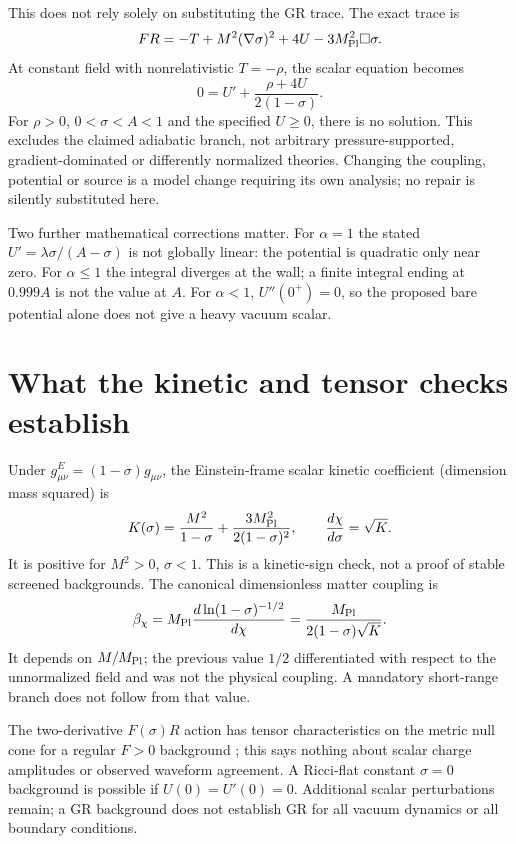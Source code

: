\documentclass[11pt,a4paper]{article}
\newcommand{\Mpl}{M_{\rm Pl}}
\begin{document}
This does not rely solely on substituting the GR trace. The exact trace is
\begin{equation}
 FR=-T+M^2(\nabla\sigma)^2+4U-3\Mpl^2\Box\sigma.
\end{equation}
At constant field with nonrelativistic $T=-\rho$, the scalar equation becomes
\begin{equation}
 0=U'+\frac{\rho+4U}{2(1-\sigma)}.
\end{equation}
For $\rho>0$, $0<\sigma<A<1$ and the specified $U\ge0$, there is no
solution. This excludes the claimed adiabatic branch, not arbitrary
pressure-supported, gradient-dominated or differently normalized theories.
Changing the coupling, potential or source is a model change requiring its
own analysis; no repair is silently substituted here.

Two further mathematical corrections matter. For $\alpha=1$ the stated
$U'=\lambda\sigma/(A-\sigma)$ is not globally linear: the potential is
quadratic only near zero. For $\alpha\le1$ the integral diverges at the
wall; a finite integral ending at $0.999A$ is not the value at $A$.
For $\alpha<1$, $U''(0^+)=0$, so the proposed bare potential alone does
not give a heavy vacuum scalar.

\section{What the kinetic and tensor checks establish}
Under $g^E_{\mu\nu}=(1-\sigma)g_{\mu\nu}$, the Einstein-frame scalar
kinetic coefficient (dimension mass squared) is
\begin{equation}
 K(\sigma)=\frac{M^2}{1-\sigma}
 +\frac{3\Mpl^2}{2(1-\sigma)^2},\qquad
 \frac{d\chi}{d\sigma}=\sqrt K.
\end{equation}
It is positive for $M^2>0$, $\sigma<1$. This is a kinetic-sign check,
not a proof of stable screened backgrounds. The canonical dimensionless
matter coupling is
\begin{equation}
 \beta_\chi=\Mpl\frac{d\ln(1-\sigma)^{-1/2}}{d\chi}
 =\frac{\Mpl}{2(1-\sigma)\sqrt K}.
\end{equation}
It depends on $M/\Mpl$; the previous value $1/2$ differentiated with respect
to the unnormalized field and was not the physical coupling. A mandatory
short-range branch does not follow from that value.

The two-derivative $F(\sigma)R$ action has tensor characteristics on the
metric null cone for a regular $F>0$ background \cite{Baker}; this says nothing about
scalar charge amplitudes or observed waveform agreement. A Ricci-flat
constant $\sigma=0$ background is possible if $U(0)=U'(0)=0$.
Additional scalar perturbations remain; a GR background does not establish
GR for all vacuum dynamics or all boundary conditions.
\end{document}
